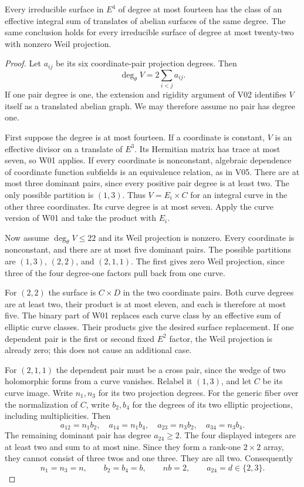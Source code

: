 \begin{proposition}[W02]
Every irreducible surface in $E^4$ of degree at most fourteen has the class of an effective integral sum of translates of abelian surfaces of the same degree. The same conclusion holds for every irreducible surface of degree at most twenty-two with nonzero Weil projection.
\end{proposition}

\begin{proof}
Let $a_{ij}$ be its six coordinate-pair projection degrees. Then
\[
\deg_\theta V=2\sum_{i<j}a_{ij}.
\]
If one pair degree is one, the extension and rigidity argument of V02 identifies $V$ itself as a translated abelian graph. We may therefore assume no pair has degree one.

First suppose the degree is at most fourteen. If a coordinate is constant, $V$ is an effective divisor on a translate of $E^3$. Its Hermitian matrix has trace at most seven, so W01 applies. If every coordinate is nonconstant, algebraic dependence of coordinate function subfields is an equivalence relation, as in V05. There are at most three dominant pairs, since every positive pair degree is at least two. The only possible partition is $(1,3)$. Thus $V=E_i\times C$ for an integral curve in the other three coordinates. Its curve degree is at most seven. Apply the curve version of W01 and take the product with $E_i$.

Now assume $\deg_\theta V\leq22$ and its Weil projection is nonzero. Every coordinate is nonconstant, and there are at most five dominant pairs. The possible partitions are $(1,3)$, $(2,2)$, and $(2,1,1)$. The first gives zero Weil projection, since three of the four degree-one factors pull back from one curve.

For $(2,2)$ the surface is $C\times D$ in the two coordinate pairs. Both curve degrees are at least two, their product is at most eleven, and each is therefore at most five. The binary part of W01 replaces each curve class by an effective sum of elliptic curve classes. Their products give the desired surface replacement. If one dependent pair is the first or second fixed $E^2$ factor, the Weil projection is already zero; this does not cause an additional case.

For $(2,1,1)$ the dependent pair must be a cross pair, since the wedge of two holomorphic forms from a curve vanishes. Relabel it $(1,3)$, and let $C$ be its curve image. Write $n_1,n_3$ for its two projection degrees. For the generic fiber over the normalization of $C$, write $b_2,b_4$ for the degrees of its two elliptic projections, including multiplicities. Then
\[
a_{12}=n_1b_2,\quad a_{14}=n_1b_4,\quad
a_{23}=n_3b_2,\quad a_{34}=n_3b_4.
\]
The remaining dominant pair has degree $a_{24}\geq2$. The four displayed integers are at least two and sum to at most nine. Since they form a rank-one $2\times2$ array, they cannot consist of three twos and one three. They are all two. Consequently
\[
n_1=n_3=n,\qquad b_2=b_4=b,\qquad nb=2,
\qquad a_{24}=d\in\{2,3\}.
\]


\end{proof}

